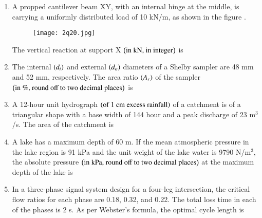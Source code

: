 \documentclass[journal,12pt,onecolumn]{article}
\theoremstyle{remark}
\begin{document}
\begin{enumerate}
\hfill{}

\item A propped cantilever beam XY, with an internal hinge at the middle, is carrying a uniformly distributed load of 10 kN/m, as shown in the figure .
\begin{figure}[H]
    \centering
    \texttt{[image: 2q20.jpg]}
    \caption{}
    \label{fig:q20}
\end{figure}
The vertical reaction at support X $\left(\text{in kN, in integer}\right)$ is \underline{\hspace{2cm}}

\hfill{}

\item The internal $\left(d_i\right)$ and external $\left(d_o\right)$ diameters of a Shelby sampler are 48 mm and 52 mm, respectively. The area ratio $\left(A_r\right)$ of the sampler $\left(\text{in \%, round off to two decimal places}\right)$ is \underline{\hspace{2cm}}

\hfill{}

\item A 12-hour unit hydrograph $\left(\text{of 1 cm excess rainfall}\right)$ of a catchment is of a triangular shape with a base width of 144 hour and a peak discharge of 23 m$^3$/s. The area of the catchment  is \underline{\hspace{2cm}}

\hfill{}

\item A lake has a maximum depth of 60 m. If the mean atmospheric pressure in the lake region is 91 kPa and the unit weight of the lake water is 9790 N/m$^3$, the absolute pressure $\left(\text{in kPa, round off to two decimal places}\right)$ at the maximum depth of the lake is \underline{\hspace{2cm}}

\hfill{}

\item In a three-phase signal system design for a four-leg intersection, the critical flow ratios for each phase are 0.18, 0.32, and 0.22. The total loss time in each of the phases is 2 s. As per Webster's formula, the optimal cycle length  is \underline{\hspace{2cm}}


\end{enumerate}
\end{document}
